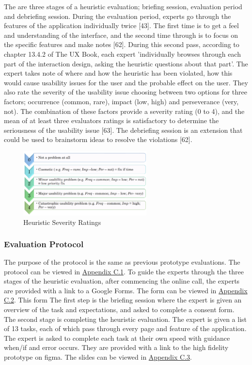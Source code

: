 \documentclass[a4 paper, 12pt]{article}
\begin{document}
    The are three stages of a heuristic evaluation; briefing session, evaluation period and debriefing session. During the evaluation period, experts go through the features of the application individually twice [43]. The first time is to get a feel and understanding of the interface, and the second time through is to focus on the specific features and make notes [62]. During this second pass, according to chapter 13.4.2 of The UX Book, each expert 'individually browses through each part of the interaction design, asking the heuristic questions about that part'. The expert takes note of where and how the heuristic has been violated, how this would cause usability issues for the user and the probable effect on the user. They also rate the severity of the usability issue choosing between two options for three factors; occurrence (common, rare), impact (low, high) and perseverance (very, not). The combination of these factors provide a severity rating (0 to 4), and the mean of at least three evaluators ratings is satisfactory to determine the seriousness of the usability issue [63]. The debriefing session is an extension that could be used to brainstorm ideas to resolve the violations [62].
        \begin{figure} [H]
            \centering
            \includegraphics[width=0.6\textwidth, frame]
                {./High_Fidelity/High_Report/images/high_heuristic_severity.PNG}  
            \caption{Heuristic Severity Ratings}
        \end{figure} 

    
    \subsubsection{Evaluation Protocol}
    The purpose of the protocol is the same as previous prototype evaluations. The protocol can be viewed in \hyperref[sec:B.1]{Appendix C.1}. To guide the experts through the three stages of the heuristic evaluation, after commencing the online call, the experts are provided with a link to a Google Forms. The form can be viewed in \hyperref[sec:C.2]{Appendix C.2}. This form  The first step is the briefing session where the expert is given an overview of the task and expectations, and asked to complete a consent form. The second stage is completing the heuristic evaluation. The expert is given a list of 13 tasks, each of which pass through every page and feature of the application. The expert is asked to complete each task at their own speed with guidance when/if and error occurs.  They are provided with a link to the high fidelity prototype on figma. The slides can be viewed in \hyperref[sec:C.3]{Appendix C.3}.
        
\end{document}
